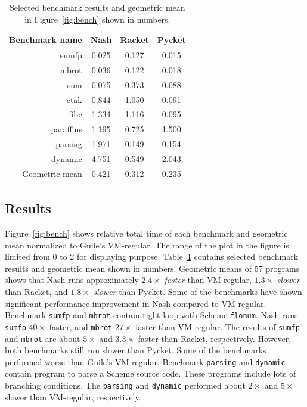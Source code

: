 \documentclass[preprint, 10pt]{sigplanconf}
\begin{document}
\begin{table}
  \centering
  \begin{tabular}{rccc}
    \toprule
    Benchmark name & Nash & Racket & Pycket \\
    \midrule
    sumfp & 0.025 & 0.127 & 0.015 \\
    mbrot & 0.036 & 0.122 & 0.018 \\
    sum & 0.075 & 0.373 & 0.088 \\
    \midrule
    ctak & 0.844 & 1.050 & 0.091 \\
    fibc & 1.334 & 1.116 & 0.095 \\
    \midrule
    paraffins & 1.195 & 0.725 & 1.500 \\
    parsing & 1.971 & 0.149 & 0.154 \\
    dynamic & 4.751 & 0.549 & 2.043 \\
    \midrule
    Geometric mean & 0.421 & 0.312 & 0.235 \\
    \bottomrule
  \end{tabular}
  \caption{Selected benchmark results and geometric mean in
    Figure~\hyperref[fig:bench]{\ref{fig:bench}} shown in numbers.}
\label{tab:bench}
\end{table}

\subsection{Results}

Figure~\ref{fig:bench} shows relative total time of each benchmark and geometric
mean normalized to Guile's VM-regular. The range of the plot in the figure is
limited from 0 to 2 for displaying
purpose. Table~\hyperref[tab:bench]{\ref{tab:bench}} contains selected benchmark
results and geometric mean shown in numbers.  Geometric means of 57 programs
shows that Nash runs approximately $2.4\times$ \textit{faster} than VM-regular,
$1.3\times$ \textit{slower} than Racket, and $1.8\times$ \textit{slower} than
Pycket.  Some of the benchmarks have shown significant performance improvement
in Nash compared to VM-regular. Benchmark \texttt{sumfp} and \texttt{mbrot}
contain tight loop with Scheme \texttt{flonum}. Nash runs \texttt{sumfp}
$40\times$ faster, and \texttt{mbrot} $27\times$ faster than VM-regular. The
results of \texttt{sumfp} and \texttt{mbrot} are about $5\times$ and $3.3\times$
faster than Racket, respectively. However, both benchmarks still run slower than
Pycket.  Some of the benchmarks performed worse than Guile's
VM-regular. Benchmark \texttt{parsing} and \texttt{dynamic} contain program to
parse a Scheme source code. These programs include lots of branching
conditions. The \texttt{parsing} and \texttt{dynamic} performed about $2\times$
and $5\times$ slower than VM-regular, respectively.
\end{document}
